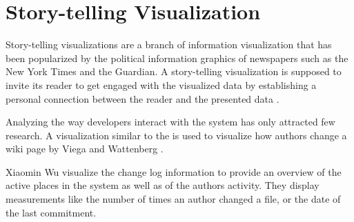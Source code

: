 
%
%

\section{Story-telling Visualization}

Story-telling visualizations are a branch of information visualization that has been popularized by the political information graphics of newspapers such as the New York Times and the Guardian. A story-telling visualization is supposed to invite its reader to get engaged with the visualized data by establishing a personal connection between the reader and the presented data \cite{Sege10a}. 

Analyzing the way developers interact with the system has only attracted few research. A visualization similar to the \omap is used to visualize how authors change a wiki page by Viega and Wattenberg \cite{Vieg04a}.

Xiaomin Wu \etal visualize \cite{Wu04b} the change log information to provide an overview of the active places in the system as well as of the authors activity. They display measurements like the number of times an author changed a file, or the date of the last commitment.

